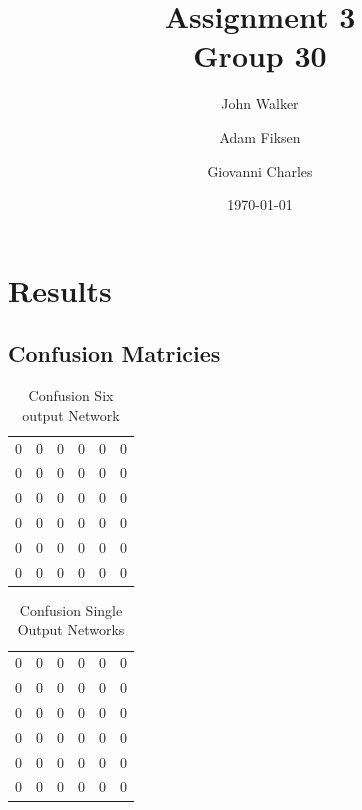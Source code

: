 \documentclass[11pt]{article}
\begin{document}
\title{Assignment 3 \\ Group 30  }

\author{John Walker \and Adam Fiksen \and Giovanni Charles }

\date{\today}         %

\maketitle           %


\section{Results}

\subsection{Confusion Matricies}

\begin{table}[H]
\caption{Confusion Six output Network} %
\centering %
\begin{tabular}{c c c c c c} %
\hline %
0  & 0   & 0  & 0   & 0  & 0 \\ %
0  & 0   & 0  & 0   & 0  & 0 \\
0  & 0   & 0  & 0   & 0  & 0 \\
0  & 0   & 0  & 0   & 0  & 0 \\
0  & 0   & 0  & 0   & 0  & 0 \\ 
0  & 0   & 0  & 0   & 0  & 0 \\ [1ex] %
\hline %
\end{tabular}
\label{table:sixconf} %
\end{table}

\begin{table}[H]
\caption{Confusion Single Output Networks} %
\centering %
\begin{tabular}{c c c c c c} %
\hline %
0  & 0   & 0  & 0   & 0  & 0 \\ %
0  & 0   & 0  & 0   & 0  & 0 \\
0  & 0   & 0  & 0   & 0  & 0 \\
0  & 0   & 0  & 0   & 0  & 0 \\
0  & 0   & 0  & 0   & 0  & 0 \\ 
0  & 0   & 0  & 0   & 0  & 0 \\ [1ex] %
\hline %
\end{tabular}
\label{table:singconf} %
\end{table}
\end{document}

